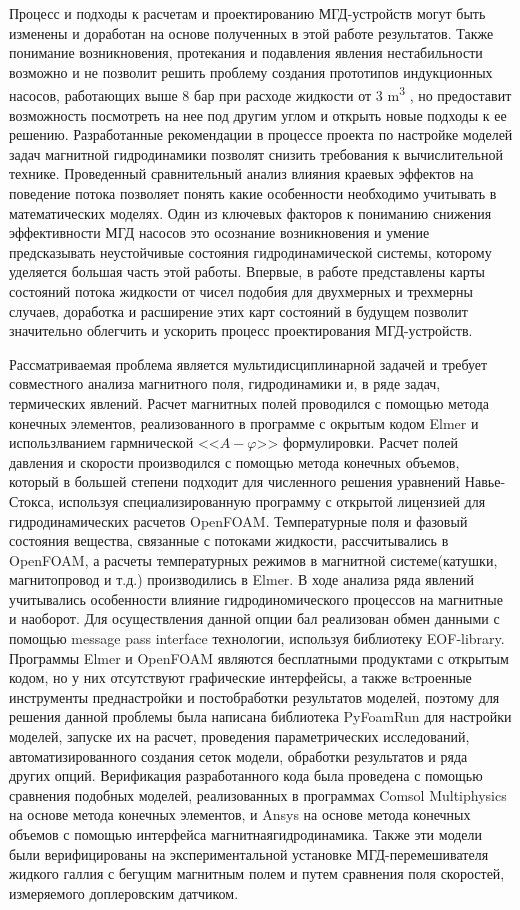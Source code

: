 {\influence} Процесс и подходы к расчетам и проектированию МГД-устройств могут быть изменены и доработан на основе полученных в этой работе результатов. Также понимание возникновения, протекания и подавления явления нестабильности возможно и не позволит решить проблему создания прототипов индукционных насосов, работающих выше 8 $бар$ при расходе жидкости от 3 \si{\metre^3} , но предоставит возможность посмотреть на нее под другим углом и открыть новые подходы к ее решению. Разработанные рекомендации в процессе проекта по настройке моделей задач магнитной гидродинамики позволят снизить требования к вычислительной технике. Проведенный сравнительный анализ влияния краевых эффектов на поведение потока позволяет понять какие особенности  необходимо учитывать в математических моделях. Один из ключевых факторов к пониманию снижения эффективности МГД насосов это осознание возникновения и умение предсказывать неустойчивые состояния гидродинамической системы, которому уделяется большая часть этой работы. Впервые, в работе представлены карты состояний потока жидкости от чисел подобия для двухмерных и трехмерны случаев, доработка и расширение этих карт состояний в будущем позволит значительно облегчить и ускорить процесс проектирования МГД-устройств.  



{\methods} Рассматриваемая проблема является мультидисциплинарной задачей и требует совместного анализа магнитного поля, гидродинамики и, в ряде задач, термических явлений. Расчет магнитных полей  проводился с помощью метода конечных элементов, реализованного в  программе с окрытым кодом Elmer и использлванием гармнической <<$A-\varphi$>> формулировки. Расчет полей давления и скорости производился с  помощью метода конечных объемов, который в большей степени подходит для численного решения уравнений Навье-Стокса, используя специализированную программу с открытой лицензией для гидродинамических расчетов OpenFOAM. Температурные поля и фазовый состояния вещества, связанные с потоками жидкости, рассчитывались в OpenFOAM, а расчеты температурных режимов в магнитной системе(катушки, магнитопровод и т.д.) производились в Elmer. В ходе анализа ряда явлений учитывались особенности влияние гидродиномического процессов на магнитные и наоборот. Для осуществления данной опции бал реализован обмен данными с помощью message pass interface технологии, используя библиотеку EOF-library. Программы Elmer и OpenFOAM являются бесплатными продуктами с открытым кодом, но у них отсутствуют графические интерфейсы, а также вcтроенные инструменты преднастройки и постобработки результатов моделей, поэтому для решения данной проблемы была написана библиотека PyFoamRun для настройки моделей, запуске их на расчет, проведения параметрических исследований, автоматизированного создания сеток модели, обработки результатов и ряда других опций. Верификация разработанного кода была проведена с помощью сравнения подобных моделей, реализованных в программах Comsol Multiphysics на основе метода конечных элементов, и Ansys на основе метода конечных объемов с помощью интерфейса магнитнаягидродинамика. Также эти модели были верифицированы на экспериментальной установке МГД-перемешивателя жидкого галлия с бегущим магнитным полем и путем сравнения поля скоростей, измеряемого доплеровским датчиком. 


